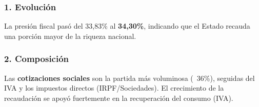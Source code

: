 \subsubsection{1. Evolución}
La presión fiscal pasó del 33,83\% al \textbf{34,30\%}, indicando que el Estado recauda una porción mayor de la riqueza nacional.
\subsubsection{2. Composición}
Las \textbf{cotizaciones sociales} son la partida más voluminosa (~36\%), seguidas del IVA y los impuestos directos (IRPF/Sociedades). El crecimiento de la recaudación se apoyó fuertemente en la recuperación del consumo (IVA).
